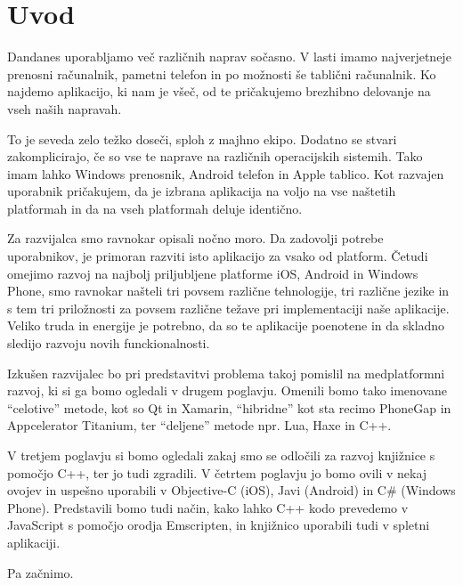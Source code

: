 \graphicspath{{img/}}







\chapter{Uvod}
\label{chap:introduction}


Dandanes uporabljamo več različnih naprav sočasno. V lasti imamo najverjetneje prenosni računalnik, pametni telefon in po možnosti še tablični računalnik. Ko najdemo aplikacijo, ki nam je všeč, od te pričakujemo brezhibno delovanje na vseh naših napravah.

To je seveda zelo težko doseči, sploh z majhno ekipo. Dodatno se stvari zakomplicirajo, če so vse te naprave na različnih operacijskih sistemih. Tako imam lahko Windows prenosnik, Android telefon in Apple tablico. Kot razvajen uporabnik pričakujem, da je izbrana aplikacija na voljo na vse naštetih platformah in da na vseh platformah deluje identično.

Za razvijalca smo ravnokar opisali nočno moro. Da zadovolji potrebe uporabnikov, je primoran razviti isto aplikacijo za vsako od platform. Četudi omejimo razvoj na najbolj priljubljene platforme iOS, Android in Windows Phone, smo ravnokar našteli tri povsem različne tehnologije, tri različne jezike in s tem tri priložnosti za povsem različne težave pri implementaciji naše aplikacije. Veliko truda in energije je potrebno, da so te aplikacije poenotene in da skladno sledijo razvoju novih funckionalnosti.

Izkušen razvijalec bo pri predstavitvi problema takoj pomislil na medplatformni razvoj, ki si ga bomo ogledali v drugem poglavju. Omenili bomo tako imenovane ``celotive'' metode, kot so Qt in Xamarin, ``hibridne'' kot sta recimo PhoneGap in Appcelerator Titanium, ter ``deljene'' metode npr. Lua, Haxe in C++.

V tretjem poglavju si bomo ogledali zakaj smo se odločili za razvoj knjižnice s pomočjo C++, ter jo tudi zgradili. V četrtem poglavju jo bomo ovili v nekaj ovojev in uspešno uporabili v Objective-C (iOS), Javi (Android) in C\# (Windows Phone). Predstavili bomo tudi način, kako lahko C++ kodo prevedemo v JavaScript s pomočjo orodja Emscripten, in knjižnico uporabili tudi v spletni aplikaciji.

Pa začnimo.
